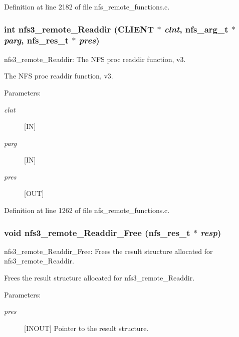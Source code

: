 Definition at line 2182 of file nfs\_\-remote\_\-functions.c.
\subsubsection[{nfs3\_\-remote\_\-Readdir}]{\setlength{\rightskip}{0pt plus 5cm}int nfs3\_\-remote\_\-Readdir (CLIENT $\ast$ {\em clnt}, \/  nfs\_\-arg\_\-t $\ast$ {\em parg}, \/  nfs\_\-res\_\-t $\ast$ {\em pres})}\label{group__NFSprocs_g0c97a6efdfbb9eb372d7adb68587a846}


nfs3\_\-remote\_\-Readdir: The NFS proc readdir function, v3.

The NFS proc readdir function, v3.

\begin{Desc}
\item[Parameters:]
\begin{description}
\item[{\em clnt}][IN] \item[{\em parg}][IN] \item[{\em pres}][OUT] \end{description}
\end{Desc}


Definition at line 1262 of file nfs\_\-remote\_\-functions.c.
\subsubsection[{nfs3\_\-remote\_\-Readdir\_\-Free}]{\setlength{\rightskip}{0pt plus 5cm}void nfs3\_\-remote\_\-Readdir\_\-Free (nfs\_\-res\_\-t $\ast$ {\em resp})}\label{group__NFSprocs_gb5b57b9416eb3c1009e1ca4ebd0bc56a}


nfs3\_\-remote\_\-Readdir\_\-Free: Frees the result structure allocated for nfs3\_\-remote\_\-Readdir.

Frees the result structure allocated for nfs3\_\-remote\_\-Readdir.

\begin{Desc}
\item[Parameters:]
\begin{description}
\item[{\em pres}][INOUT] Pointer to the result structure. \end{description}
\end{Desc}


